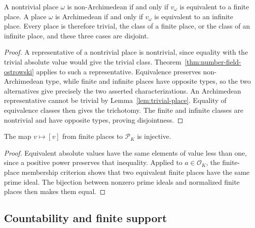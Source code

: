 \begin{proposition}\label{prop:number-field-place-classification}
\leanok
{}
A nontrivial place $\omega$ is non-Archimedean if and only if
$v_\omega$ is equivalent to a finite place. A place $\omega$ is
Archimedean if and only if $v_\omega$ is equivalent to an infinite place.
Every place is therefore trivial, the class of a finite place, or the
class of an infinite place, and these three cases are disjoint.
\end{proposition}
\begin{proof}
A representative of a nontrivial place is nontrivial, since equality
with the trivial absolute value would give the trivial class.
Theorem~\ref{thm:number-field-ostrowski} applies to such a representative.
Equivalence preserves non-Archimedean type, while finite and infinite
places have opposite types, so the two alternatives give precisely the
two asserted characterizations. An Archimedean representative cannot be
trivial by Lemma~\ref{lem:trivial-place}. Equality of equivalence classes
then gives the trichotomy. The finite and infinite classes are nontrivial
and have opposite types, proving disjointness.
\end{proof}

\begin{lemma}\label{lem:finite-place-injectivity}
\leanok
{}
The map $v\mapsto[v]$ from finite places to $\mathcal P_K$ is injective.
\end{lemma}
\begin{proof}
Equivalent absolute values have the same elements of value less than one,
since a positive power preserves that inequality. Applied to
$a\in\mathcal O_K$, the finite-place membership criterion shows that
two equivalent finite places have the same prime ideal. The bijection
between nonzero prime ideals and normalized finite places then makes
them equal.
\end{proof}

\subsection{Countability and finite support}

